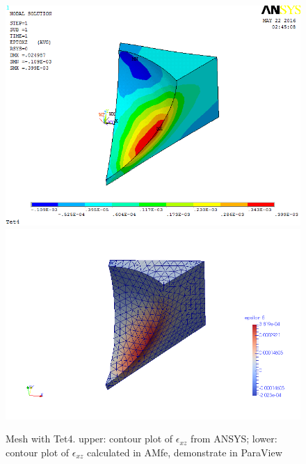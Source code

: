 \begin{figure}[htbp]
	\begin{center}
		\includegraphics[width=13cm,clip]{Tet4Exz.png} 		
		\includegraphics[width=13cm,clip]{Tet4ExzP.png} 		
		\caption{Mesh with Tet4. upper: contour plot of $\epsilon_{xz}$ from ANSYS; lower: contour plot of $\epsilon_{xz}$ calculated in AMfe, demonstrate in ParaView} \label{fig: Tet4Exz}
	\end{center}
\end{figure}
\clearpage 

